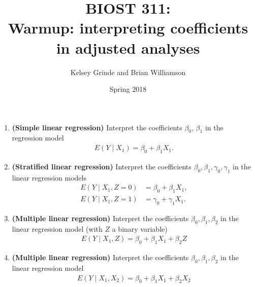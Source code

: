 \documentclass{article}
\begin{document}
\title{BIOST 311: \\ Warmup: interpreting coefficients in adjusted analyses}
\author{Kelsey Grinde and Brian Williamson}
\date{Spring 2018}

\maketitle

\begin{enumerate}
\item \textbf{(Simple linear regression)} Interpret the coefficients $\beta_0$, $\beta_1$ in the regression model 
\begin{align*}
E(Y \mid X_1) = \beta_0 + \beta_1 X_1.
\end{align*}

\item \textbf{(Stratified linear regression)} Interpret the coefficients $\beta_0, \beta_1, \gamma_0, \gamma_1$ in the linear regression models
\begin{align*}
E(Y \mid X_1, Z = 0) &= \beta_0 + \beta_1 X_1, \\
E(Y \mid X_1, Z = 1) &= \gamma_0 + \gamma_1 X_1.
\end{align*}

\item \textbf{(Multiple linear regression)} Interpret the coefficients $\beta_0, \beta_1, \beta_2$ in the linear regression model (with $Z$ a binary variable)
\begin{align*}
E(Y \mid X_1, Z) = \beta_0 + \beta_1 X_1 + \beta_2 Z
\end{align*}

\item \textbf{(Multiple linear regression)} Interpret the coefficients $\beta_0, \beta_1, \beta_2$ in the linear regression model 
\begin{align*}
E(Y \mid X_1, X_2) = \beta_0 + \beta_1 X_1 + \beta_2 X_2
\end{align*}
\end{enumerate}
\end{document}
